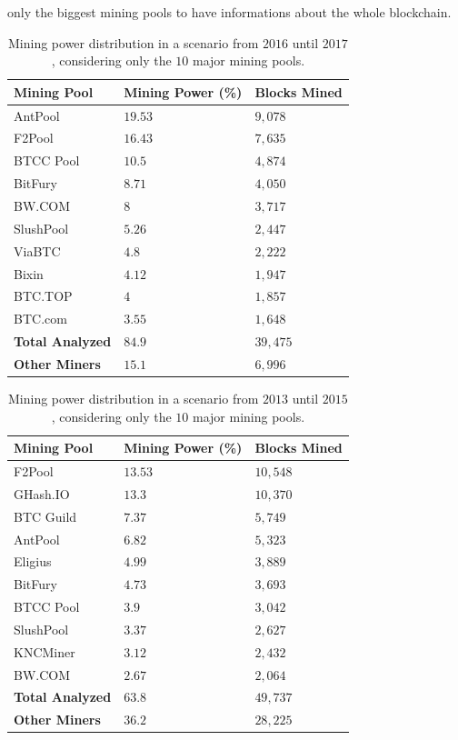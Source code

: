 \documentclass[USenglish]{uit-thesis}
\begin{document}
only the biggest mining pools to have informations
about the whole blockchain.
\begin{table}
	\centering
	\caption{Mining power distribution in a scenario from $2016$ until $2017$,
		considering only the $10$ major mining pools.}
	\label{tab:miner_share_2017}
	\begin{tabular}{|p{3.3cm}|p{3.3cm}|p{3.3cm}|} \hline
		\textbf{Mining Pool}&\textbf{Mining Power (\%)}& \textbf{Blocks Mined}\\
		\hline
		\rowcolor{AntPool}
		AntPool&$19.53$&$9,078$\\
		\hline
		\rowcolor{F2Pool}
		F2Pool&$16.43$&$7,635$\\
		\hline
		\rowcolor{BTCC Pool}
		BTCC Pool&$10.5$&$4,874$\\
		\hline
		\rowcolor{BitFury}
		BitFury&$8.71$&$4,050$\\
		\hline
		\rowcolor{BW.COM}
		BW.COM&$8$&$3,717$\\
		\hline
		\rowcolor{SlushPool}
		SlushPool&$5.26$&$2,447$\\
		\hline
		ViaBTC&$4.8$&$2,222$\\
		\hline
		Bixin&$4.12$&$1,947$\\
		\hline
		BTC.TOP&$4$&$1,857$\\
		\hline
		BTC.com&$3.55$&$1,648$\\
		\hline
		\rowcolor{TablesColor}
		\textbf{Total Analyzed}&$84.9$&$39,475$\\
		\hline
		\textbf{Other Miners}&$15.1$&$6,996$\\
		\hline
	\end{tabular}
\end{table}
\begin{table}
	\centering
	\caption{Mining power distribution in a scenario from $2013$ until $2015$,
		considering only the $10$ major mining pools.}
	\label{tab:miner_share_2015}
	\begin{tabular}{|p{3.3cm}|p{3.3cm}|p{3.3cm}|} \hline
		\textbf{Mining Pool}&\textbf{Mining Power (\%)}& \textbf{Blocks Mined}\\
		\hline
		\rowcolor{F2Pool}
		F2Pool&$13.53$&$10,548$\\
		\hline
		GHash.IO&$13.3$&$10,370$\\
		\hline
		BTC Guild&$7.37$&$5,749$\\
		\hline
		\rowcolor{AntPool}
		AntPool&$6.82$&$5,323$\\
		\hline
		Eligius&$4.99$&$3,889$\\
		\hline
		\rowcolor{BitFury}
		BitFury&$4.73$&$3,693$\\
		\hline
		\rowcolor{BTCC Pool}
		BTCC Pool&$3.9$&$3,042$\\
		\hline
		\rowcolor{SlushPool}
		SlushPool&$3.37$&$2,627$\\
		\hline
		KNCMiner&$3.12$&$2,432$\\
		\hline
		\rowcolor{BW.COM}
		BW.COM&$2.67$&$2,064$\\
		\hline
		\rowcolor{TablesColor}
		\textbf{Total Analyzed}&$63.8$&$49,737$\\
		\hline
		\textbf{Other Miners}&$36.2$&$28,225$\\
		\hline
	\end{tabular}
\end{table}
\end{document}
